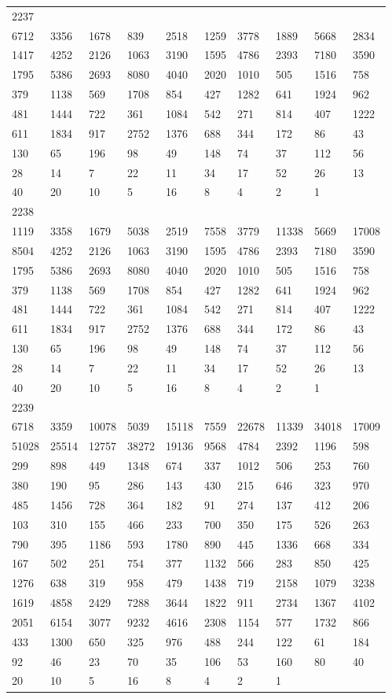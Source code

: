 \begin{longtable}{*{10}{l}}
2237&&&&&&&&&\\
6712& 3356& 1678& 839& 2518& 1259& 3778& 1889& 5668& 2834\\
1417& 4252& 2126& 1063& 3190& 1595& 4786& 2393& 7180& 3590\\
1795& 5386& 2693& 8080& 4040& 2020& 1010& 505& 1516& 758\\
379& 1138& 569& 1708& 854& 427& 1282& 641& 1924& 962\\
481& 1444& 722& 361& 1084& 542& 271& 814& 407& 1222\\
611& 1834& 917& 2752& 1376& 688& 344& 172& 86& 43\\
130& 65& 196& 98& 49& 148& 74& 37& 112& 56\\
28& 14& 7& 22& 11& 34& 17& 52& 26& 13\\
40& 20& 10& 5& 16& 8& 4& 2& 1& \\

2238&&&&&&&&&\\
1119& 3358& 1679& 5038& 2519& 7558& 3779& 11338& 5669& 17008\\
8504& 4252& 2126& 1063& 3190& 1595& 4786& 2393& 7180& 3590\\
1795& 5386& 2693& 8080& 4040& 2020& 1010& 505& 1516& 758\\
379& 1138& 569& 1708& 854& 427& 1282& 641& 1924& 962\\
481& 1444& 722& 361& 1084& 542& 271& 814& 407& 1222\\
611& 1834& 917& 2752& 1376& 688& 344& 172& 86& 43\\
130& 65& 196& 98& 49& 148& 74& 37& 112& 56\\
28& 14& 7& 22& 11& 34& 17& 52& 26& 13\\
40& 20& 10& 5& 16& 8& 4& 2& 1& \\

2239&&&&&&&&&\\
6718& 3359& 10078& 5039& 15118& 7559& 22678& 11339& 34018& 17009\\
51028& 25514& 12757& 38272& 19136& 9568& 4784& 2392& 1196& 598\\
299& 898& 449& 1348& 674& 337& 1012& 506& 253& 760\\
380& 190& 95& 286& 143& 430& 215& 646& 323& 970\\
485& 1456& 728& 364& 182& 91& 274& 137& 412& 206\\
103& 310& 155& 466& 233& 700& 350& 175& 526& 263\\
790& 395& 1186& 593& 1780& 890& 445& 1336& 668& 334\\
167& 502& 251& 754& 377& 1132& 566& 283& 850& 425\\
1276& 638& 319& 958& 479& 1438& 719& 2158& 1079& 3238\\
1619& 4858& 2429& 7288& 3644& 1822& 911& 2734& 1367& 4102\\
2051& 6154& 3077& 9232& 4616& 2308& 1154& 577& 1732& 866\\
433& 1300& 650& 325& 976& 488& 244& 122& 61& 184\\
92& 46& 23& 70& 35& 106& 53& 160& 80& 40\\
20& 10& 5& 16& 8& 4& 2& 1& \\


\end{longtable}
